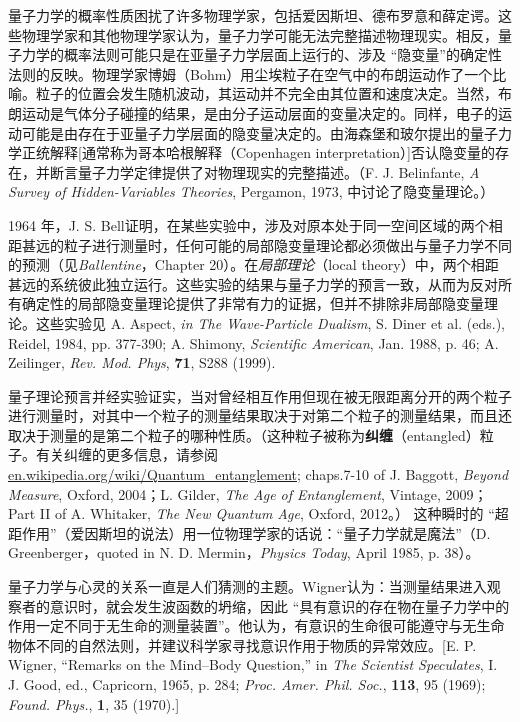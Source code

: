     量子力学的概率性质困扰了许多物理学家，包括爱因斯坦、德布罗意和薛定谔。这些物理学家和其他物理学家认为，量子力学可能无法完整描述物理现实。相反，量子力学的概率法则可能只是在亚量子力学层面上运行的、涉及 “隐变量”的确定性法则的反映。物理学家博姆（Bohm）用尘埃粒子在空气中的布朗运动作了一个比喻。粒子的位置会发生随机波动，其运动并不完全由其位置和速度决定。当然，布朗运动是气体分子碰撞的结果，是由分子运动层面的变量决定的。同样，电子的运动可能是由存在于亚量子力学层面的隐变量决定的。由海森堡和玻尔提出的量子力学正统解释[通常称为哥本哈根解释（Copenhagen interpretation）]否认隐变量的存在，并断言量子力学定律提供了对物理现实的完整描述。（F. J. Belinfante, \textit{A Survey of  Hidden-Variables Theories}, Pergamon, 1973, 中讨论了隐变量理论。）

    1964 年，J. S. Bell证明，在某些实验中，涉及对原本处于同一空间区域的两个相距甚远的粒子进行测量时，任何可能的局部隐变量理论都必须做出与量子力学不同的预测（见\textit{Ballentine}，Chapter 20）。在\textit{局部理论}（local theory）中，两个相距甚远的系统彼此独立运行。这些实验的结果与量子力学的预言一致，从而为反对所有确定性的局部隐变量理论提供了非常有力的证据，但并不排除非局部隐变量理论。这些实验见 A. Aspect, \textit{in The Wave-Particle Dualism}, S. Diner et al. (eds.), Reidel, 1984, pp. 377-390; A. Shimony, \textit{Scientific American}, Jan. 1988, p. 46; A. Zeilinger, \textit{Rev. Mod. Phys}, \textbf{71}, S288 (1999).

    量子理论预言并经实验证实，当对曾经相互作用但现在被无限距离分开的两个粒子进行测量时，对其中一个粒子的测量结果取决于对第二个粒子的测量结果，而且还取决于测量的是第二个粒子的哪种性质。（这种粒子被称为\textbf{纠缠}（entangled）粒子。有关纠缠的更多信息，请参阅 \url{en.wikipedia.org/wiki/Quantum_entanglement}; chaps.7-10 of J. Baggott, \textit{Beyond Measure}, Oxford, 2004；L. Gilder, \textit{The Age of Entanglement}, Vintage, 2009；Part II of A. Whitaker, \textit{The New Quantum Age}, Oxford, 2012。） 这种瞬时的 “超距作用”（爱因斯坦的说法）用一位物理学家的话说：“量子力学就是魔法”（D. Greenberger，quoted in N. D. Mermin，\textit{Physics Today}, April 1985, p. 38）。

    量子力学与心灵的关系一直是人们猜测的主题。Wigner认为：当测量结果进入观察者的意识时，就会发生波函数的坍缩，因此 “具有意识的存在物在量子力学中的作用一定不同于无生命的测量装置”。他认为，有意识的生命很可能遵守与无生命物体不同的自然法则，并建议科学家寻找意识作用于物质的异常效应。[E. P. Wigner, “Remarks on the Mind–Body Question,” in \textit{The Scientist Speculates}, I. J. Good, ed., Capricorn, 1965, p. 284; \textit{Proc. Amer. Phil. Soc.}, \textbf{113}, 95 (1969); \textit{Found. Phys.}, \textbf{1}, 35 (1970).]

